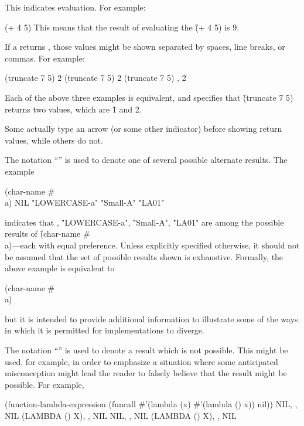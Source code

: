 \beginlist
\itemitem{\EV}

This indicates evaluation.
For example:

\code
 (+ 4 5)  
\endcode
This means that the result of
evaluating the  \f{(+ 4 5)} is \f{9}.
                                                                 
If a  returns , those values might
be shown separated by spaces, line breaks, or commas.
For example:

\code
 (truncate 7 5)
 2
 (truncate 7 5) 
   2
 (truncate 7 5)
, 2
\endcode

Each of the above three examples is equivalent, and specifies
that \f{(truncate 7 5)} returns two values, which are \f{1} and \f{2}.

Some  actually type an arrow (or some
other indicator) before showing return values, while others do not.

\itemitem{\OV}

The notation ``{\OV}'' is used to denote one of several possible
alternate results.  The example

\code
 (char-name #\\a)
\EV NIL
\OV "LOWERCASE-a"
\OV "Small-A"
\OV "LA01"
\endcode

indicates that \nil, \f{"LOWERCASE-a"}, \f{"Small-A"}, \f{"LA01"} are
among the possible results of \f{(char-name \#\\a)}---each with equal preference.
Unless explicitly specified otherwise, it should not be assumed that the set of possible 
results shown is exhaustive.
Formally, the above example is equivalent to

\code
 (char-name #\\a) \EV {}
\endcode

but it is intended to provide additional information to illustrate some
of the ways in which it is permitted for implementations to diverge.

\itemitem{\NV}

The notation ``{\NV}'' is used to denote a result which is not possible.
This might be used, for example, in order to emphasize a situation where
some anticipated misconception might lead the reader to falsely believe
that the result might be possible.  For example,

\code
 (function-lambda-expression 
    (funcall #'(lambda (x) #'(lambda () x)) nil))
\EV NIL, , NIL
\OV (LAMBDA () X), , NIL
\NV NIL, , NIL
\NV (LAMBDA () X), , NIL
\endcode

